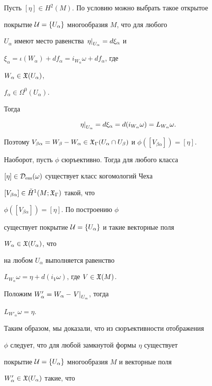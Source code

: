 \begin{pf}


Пусть $[\eta] \in H^2(M)$. По условию можно выбрать такое открытое


покрытие ${\cal U}=\{U_\alpha\}$ многообразия  $M$, что для любого


$U_\alpha$ имеют место равенства $\left. \eta \right|_{U_\alpha} = d\xi_\alpha$ и


$\xi_\alpha = \iota(W_\alpha) + df_\alpha


= i_{W_\alpha}\omega + df_\alpha$, где


$W_\alpha \in {\frak X}(U_\alpha)$,


$f_\alpha \in \Omega^0(U_\alpha)$.


Тогда


$$


\rest{\eta}{U_\alpha} = d\xi_\alpha = d(i_{W_\alpha}\omega) =


L_{W_\alpha}\omega.


$$


Поэтому $V_{\beta\alpha} = W_\beta - W_\alpha \in


\gX_\Gamma(U_\alpha \cap U_\beta)$ и $\phi([V_{\beta\alpha}])=[\eta]$.





Наоборот, пусть $\phi$ сюръективно. Тогда для любого класса


$[\eta] \in {\cal D}_{\operatorname{ess}}(\omega)$ существует класс когомологий Чеха


$[V_{\beta\alpha}] \in \check H^1(M; {\frak X}_\Gamma)$ такой, что


$\phi([V_{\beta\alpha}]) = [\eta]$. По построению $\phi$


существует покрытие ${\cal U}=\{U_\alpha\}$ и  такие векторные поля


$W_\alpha \in {\frak X}(U_\alpha)$, что


на любом $U_\alpha$ выполняется равенство


$L_{W_\alpha}\omega = \eta + d(i_V\omega)$, где $V \in {\frak X}(M)$.


Положим $W'_\alpha = W_\alpha - \left. V \right|_{U_\alpha}$, тогда


$L_{W'_\alpha}\omega = \eta$.


Таким образом, мы доказали, что из сюръективности отображения


$\phi$ следует, что для любой замкнутой формы $\eta$ существует


покрытие ${\cal U}=\{U_\alpha\}$ многообразия $M$ и векторные поля


$W'_\alpha \in {\frak X}(U_\alpha)$ такие, что



\end{pf}
